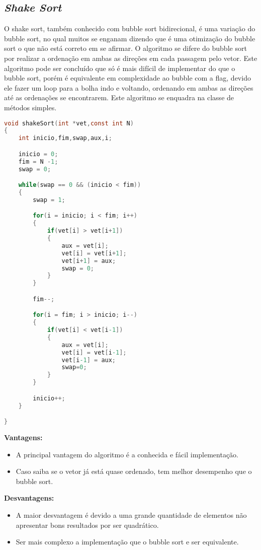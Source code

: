 \documentclass[
	12pt,				%
	oneside,			%
	a4paper,			%
	english,			%
	brazil,				%
	]{article}
\begin{document}
\subsection{\textit{Shake Sort}}
O shake sort, também conhecido com bubble sort bidirecional, é uma variação do bubble sort, no qual muitos se enganam dizendo que é uma otimização do bubble sort
 o que não está correto em se afirmar. O algoritmo se difere do bubble sort por realizar a ordenação em ambas as direções em cada passagem pelo vetor. Este algoritmo 
 pode ser concluído que só é mais difícil de implementar do que o bubble sort, porém é equivalente em complexidade ao bubble com a flag, devido ele fazer um
 loop para a bolha indo e voltando, ordenando em ambas as direções até as ordenações se encontrarem. Este algoritmo se enquadra na classe de métodos simples.\cite{Shake}
\begin{lstlisting}[language=C, caption=Estrutura \textit{Shake}]
void shakeSort(int *vet,const int N)
{
	int inicio,fim,swap,aux,i;

	inicio = 0;
	fim = N -1;
	swap = 0;

	while(swap == 0 && (inicio < fim))
	{
		swap = 1;

		for(i = inicio; i < fim; i++)
		{
			if(vet[i] > vet[i+1])
			{
				aux = vet[i];
				vet[i] = vet[i+1];
				vet[i+1] = aux;
				swap = 0;
			}
		}

		fim--;

		for(i = fim; i > inicio; i--)
		{
			if(vet[i] < vet[i-1])
			{
				aux = vet[i];
				vet[i] = vet[i-1];
				vet[i-1] = aux;
				swap=0;
			}
		}

		inicio++;
	}

}
\end{lstlisting}
\textbf{Vantagens:}
\begin{itemize}
 \item A principal vantagem do algoritmo é a conhecida e fácil implementação.
 \item Caso saiba se o vetor já está quase ordenado, tem melhor desempenho que o bubble sort.
\end{itemize}
\textbf{Desvantagens:}
\begin{itemize}
 \item A maior desvantagem é devido a uma grande quantidade de elementos não apresentar bons resultados por ser quadrático.
 \item Ser mais complexo a implementação que o bubble sort e ser equivalente.
\end{itemize}
\end{document}
